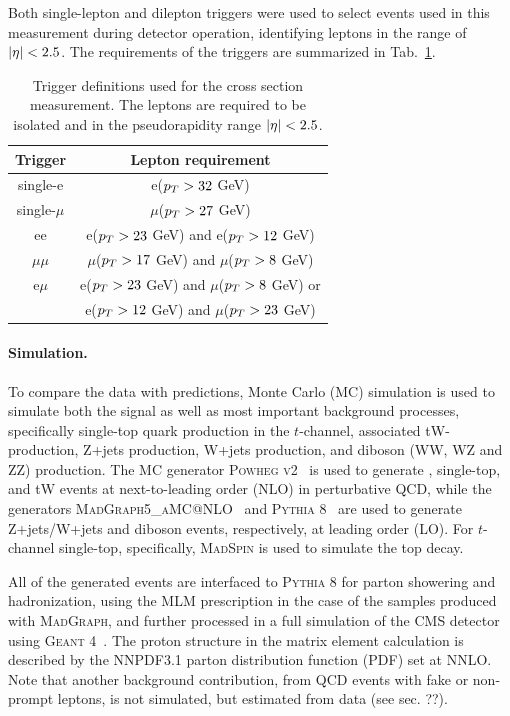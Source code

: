
Both single-lepton and dilepton triggers were used to select events used in this measurement during detector operation, identifying leptons in the range of $|\eta| < 2.5$. The \pt requirements of the triggers are summarized in Tab.~\ref{tab:ttxs:triggers}.

\begin{table}
    \centering
    \begin{tabular}{c|c}
        Trigger & Lepton requirement \\
        \hline
        single-e & e($p_T > 32$ GeV) \\
        single-$\mu$ & $\mu$($p_T > 27$ GeV) \\
        ee & e($p_T > 23$ GeV) and e($p_T > 12$ GeV) \\
        $\mu\mu$ & $\mu$($p_T > 17$ GeV) and $\mu$($p_T > 8$ GeV) \\
        e$\mu$ & e($p_T > 23$ GeV) and $\mu$($p_T > 8$ GeV)  or \\
        & e($p_T > 12$ GeV) and $\mu$($p_T > 23$ GeV) \\
    \end{tabular}
    \caption{Trigger definitions used for the \ttbar cross section measurement. The leptons are required to be isolated and in the pseudorapidity range  $|\eta| < 2.5$.}
    \label{tab:ttxs:triggers}
\end{table}

\paragraph{Simulation.}
To compare the data with predictions, Monte Carlo (MC) simulation is used to simulate both the \ttbar signal as well as most important background processes, specifically single-top quark production in the $t$-channel, associated tW-production, Z+jets production, W+jets production, and diboson (WW, WZ and ZZ) production. The MC generator \textsc{Powheg v2}~\cite{Powheg:2004, Powheg:2007, Powheg:2010} is used to generate \ttbar, single-top, and tW events at next-to-leading order (NLO) in perturbative QCD, while the generators \textsc{MadGraph5\_aMC@NLO}~\cite{MG5aMCatNLO:2014} and \textsc{Pythia 8}~\cite{Pythia:2015} are used to generate Z+jets/W+jets and diboson events, respectively, at leading order (LO). For $t$-channel single-top, specifically, \textsc{MadSpin} is used to simulate the top decay.

All of the generated events are interfaced to \textsc{Pythia 8} for parton showering and hadronization, using the MLM prescription in the case of the samples produced with \textsc{MadGraph}, and further processed in a full simulation of the CMS detector using \textsc{Geant 4}~\cite{GEANT4:2002}. The proton structure in the matrix element calculation is described by the NNPDF3.1 parton distribution function (PDF) set at NNLO. Note that another background contribution, from QCD events with fake or non-prompt leptons, is not simulated, but estimated from data (see sec. ??).

